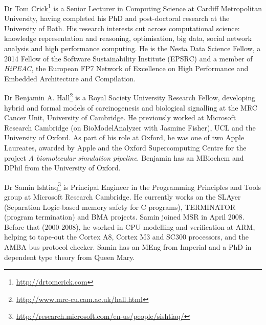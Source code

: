 \documentclass[a4paper,11pt]{article}
\begin{document}
Dr Tom Crick\footnote{\url{http://drtomcrick.com}} is a Senior
Lecturer in Computing Science at Cardiff Metropolitan University,
having completed his PhD and post-doctoral research at the University
of Bath. His research interests cut across computational science:
knowledge representation and reasoning, optimisation, big data, social
network analysis and high performance computing. He is the Nesta Data
Science Fellow, a 2014 Fellow of the Software Sustainability Institute
(EPSRC) and a member of {\emph{HiPEAC}}, the European FP7 Network of
Excellence on High Performance and Embedded Architecture and
Compilation.

Dr Benjamin
A. Hall\footnote{\url{http://www.mrc-cu.cam.ac.uk/hall.html}} is a
Royal Society University Research Fellow, developing hybrid and formal
models of carcinogenesis and biological signalling at the MRC Cancer
Unit, University of Cambridge. He previously worked at Microsoft
Research Cambridge (on BioModelAnalyzer with Jasmine Fisher), UCL and
the University of Oxford. As part of his role at Oxford, he was one of
two Apple Laureates, awarded by Apple and the Oxford Supercomputing
Centre for the project {\emph{A biomolecular simulation
pipeline}}. Benjamin has an MBiochem and DPhil from the University of
Oxford.

Dr Samin
Ishtiaq\footnote{\url{http://research.microsoft.com/en-us/people/sishtiaq/}}
is Principal Engineer in the Programming Principles and Tools group at
Microsoft Research Cambridge. He currently works on the SLAyer
(Separation Logic-based memory safety for C programs), TERMINATOR
(program termination) and BMA projects. Samin joined MSR in April
2008. Before that (2000-2008), he worked in CPU modelling and
verification at ARM, helping to tape-out the Cortex A8, Cortex M3 and
SC300 processors, and the AMBA bus protocol checker. Samin has an MEng
from Imperial and a PhD in dependent type theory from Queen Mary.



\end{document}
